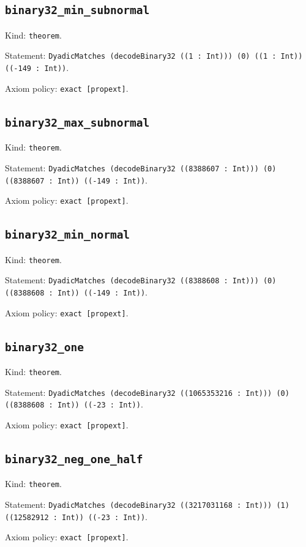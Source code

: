 \documentclass[11pt]{article}
\begin{document}
\subsection*{\texttt{binary32\_min\_subnormal}}
\noindent Kind: \texttt{theorem}.\par
\noindent Statement: \texttt{DyadicMatches (decodeBinary32 ((1 : Int))) (0) ((1 : Int)) ((-149 : Int))}.\par
\noindent Axiom policy: \texttt{exact [propext]}.\par
\subsection*{\texttt{binary32\_max\_subnormal}}
\noindent Kind: \texttt{theorem}.\par
\noindent Statement: \texttt{DyadicMatches (decodeBinary32 ((8388607 : Int))) (0) ((8388607 : Int)) ((-149 : Int))}.\par
\noindent Axiom policy: \texttt{exact [propext]}.\par
\subsection*{\texttt{binary32\_min\_normal}}
\noindent Kind: \texttt{theorem}.\par
\noindent Statement: \texttt{DyadicMatches (decodeBinary32 ((8388608 : Int))) (0) ((8388608 : Int)) ((-149 : Int))}.\par
\noindent Axiom policy: \texttt{exact [propext]}.\par
\subsection*{\texttt{binary32\_one}}
\noindent Kind: \texttt{theorem}.\par
\noindent Statement: \texttt{DyadicMatches (decodeBinary32 ((1065353216 : Int))) (0) ((8388608 : Int)) ((-23 : Int))}.\par
\noindent Axiom policy: \texttt{exact [propext]}.\par
\subsection*{\texttt{binary32\_neg\_one\_half}}
\noindent Kind: \texttt{theorem}.\par
\noindent Statement: \texttt{DyadicMatches (decodeBinary32 ((3217031168 : Int))) (1) ((12582912 : Int)) ((-23 : Int))}.\par
\noindent Axiom policy: \texttt{exact [propext]}.\par
\end{document}
